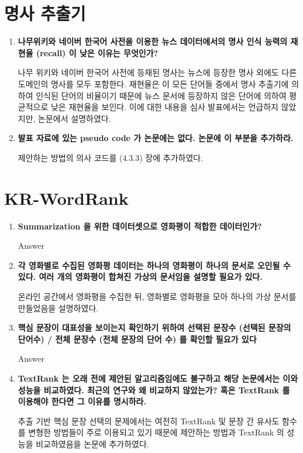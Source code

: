 \documentclass[11pt]{article}
\begin{document}
\section{명사 추출기}
\begin{enumerate}
\item \textbf{나무위키와 네이버 한국어 사전을 이용한 뉴스 데이터에서의 명사 인식 능력의 재현율 (recall) 이 낮은 이유는 무엇인가?}

나무 위키와 네이버 한국어 사전에 등재된 명사는 뉴스에 등장한 명사 외에도 다른 도메인의 명사를 모두 포함한다.
재현율은 이 모든 단어들 중에서 명사 추출기에 의하여 인식된 단어의 비율이기 때문에 뉴스 문서에 등장하지 않은 단어에 의하여 평균적으로 낮은 재현율을 보인다. 
이에 대한 내용을 심사 발표에서는 언급하지 않았지만, 논문에서 설명하였다.


\item \textbf{발표 자료에 있는 pseudo code 가 논문에는 없다. 논문에 이 부분을 추가하라.}

제안하는 방법의 의사 코드를 (4.3.3) 장에 추가하였다.

\end{enumerate}


\section{KR-WordRank}
\begin{enumerate}
\item \textbf{Summarization 을 위한 데이터셋으로 영화평이 적합한 데이터인가?}

Answer

\item \textbf{각 영화별로 수집된 영화평 데이터는 하나의 영화평이 하나의 문서로 오인될 수 있다. 여러 개의 영화평이 합쳐진 가상의 문서임을 설명할 필요가 있다.}

온라인 공간에서 영화평을 수집한 뒤, 영화별로 영화평을 모아 하나의 가상 문서를 만들었음을 설명하였다.

\item \textbf{핵심 문장이 대표성을 보이는지 확인하기 위하여 선택된 문장수 (선택된 문장의 단어수) / 전체 문장수 (전체 문장의 단어 수) 를 확인할 필요가 있다}

Answer

\item \textbf{TextRank 는 오래 전에 제안된 알고리즘임에도 불구하고 해당 논문에서는 이와 성능을 비교하였다. 최근의 연구와 왜 비교하지 않았는가? 혹은 TextRank 를 이용해야 한다면 그 이유를 명시하라.}

추출 기반 핵심 문장 선택의 문제에서는 여전히 TextRank 및 문장 간 유사도 함수를 변형한 방법들이 주로 이용되고 있기 때문에 제안하는 방법과 TextRank 의 성능을 비교하였음을 논문에 추가하였다.

\end{enumerate}
\end{document}
